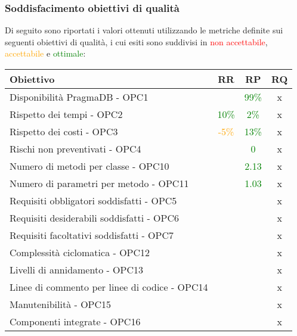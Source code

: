 \documentclass[PdQ.tex]{subfiles}
\begin{document}
\subsubsection{Soddisfacimento obiettivi di qualità}
			Di seguito sono riportati i valori ottenuti utilizzando le metriche definite sui seguenti obiettivi di qualità, i cui esiti sono suddivisi in \textcolor{red}{non accettabile}, \textcolor{orange}{accettabile} e \textcolor{green}{ottimale}:
			\begin{table}[h]
				\centering
				\begin{tabular}{l c c c}
					\hline
					\rule[-0.3cm]{0cm}{0.8cm}
					\textbf{Obiettivo} & \textbf{RR} & \textbf{RP} & \textbf{RQ}\\
					\hline
					\rule[0cm]{0cm}{0.4cm}
					Disponibilità PragmaDB - OPC1 & & \textcolor{green}{99\%} & x \\
					\rule[0cm]{0cm}{0.4cm}
					Rispetto dei tempi - OPC2 & \textcolor{green}{10\%} & \textcolor{green}{2\%} & x \\
					\rule[0cm]{0cm}{0.4cm}
					Rispetto dei costi - OPC3 & \textcolor{orange}{-5\%} & \textcolor{green}{13\%} & x\\ 
					\rule[0cm]{0cm}{0.4cm}
					Rischi non preventivati - OPC4 & & \textcolor{green}{0} & x\\ 
					\rule[0cm]{0cm}{0.4cm}
					Numero di metodi per classe - OPC10 & & \textcolor{green}{2.13} & x\\ 
					\rule[0cm]{0cm}{0.4cm}
					Numero di parametri per metodo - OPC11 & & \textcolor{green}{1.03} & x\\
					\rule[0cm]{0cm}{0.4cm} 
					Requisiti obbligatori soddisfatti - OPC5 & & & x \\
					\rule[0cm]{0cm}{0.4cm} 
					Requisiti desiderabili soddisfatti - OPC6 & & & x \\
					\rule[0cm]{0cm}{0.4cm} 
					Requisiti facoltativi soddisfatti - OPC7 & & & x \\
					\rule[0cm]{0cm}{0.4cm} 
					Complessità ciclomatica - OPC12 & & & x \\
					\rule[0cm]{0cm}{0.4cm} 
					Livelli di annidamento - OPC13 & & & x \\
					\rule[0cm]{0cm}{0.4cm} 
					Linee di commento per linee di codice - OPC14 & & & x \\
					\rule[0cm]{0cm}{0.4cm} 
					Manutenibilità - OPC15 & & & x \\
					\rule[0cm]{0cm}{0.4cm} 
					Componenti integrate - OPC16 & & & x \\

\end{tabular}
\end{table}
\end{document}
